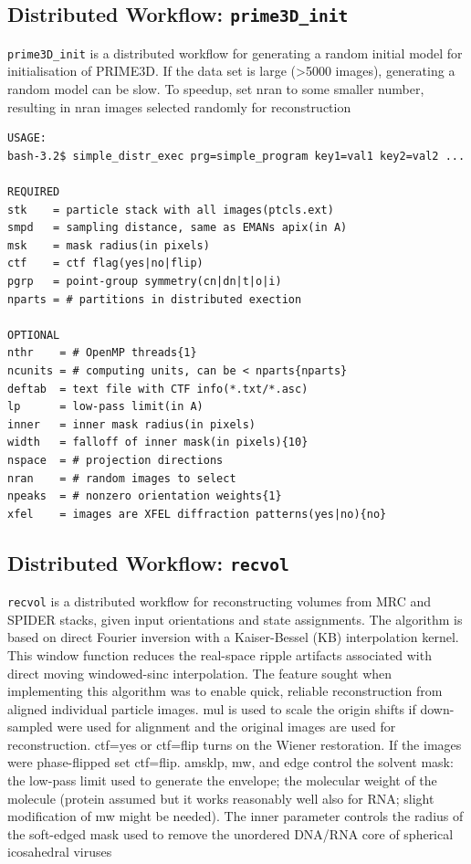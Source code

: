 \documentclass[a4paper,11pt]{article}
\newcommand{\prgname}[1]{\textcolor{NavyBlue}{\texttt{#1}}}
\begin{document}
\subsection{Distributed Workflow: \prgname{prime3D\_init}}
\label{prime3D_init}
\prgname{prime3D\_init} is a distributed workflow for generating a random initial model for initialisation of PRIME3D. If the data set is large (>5000 images), generating a random model can be slow. To speedup, set nran to some smaller number, resulting in nran images selected randomly for reconstruction

\begin{verbatim}
USAGE:
bash-3.2$ simple_distr_exec prg=simple_program key1=val1 key2=val2 ...

REQUIRED
stk    = particle stack with all images(ptcls.ext)
smpd   = sampling distance, same as EMANs apix(in A)
msk    = mask radius(in pixels)
ctf    = ctf flag(yes|no|flip)
pgrp   = point-group symmetry(cn|dn|t|o|i)
nparts = # partitions in distributed exection

OPTIONAL
nthr    = # OpenMP threads{1}
ncunits = # computing units, can be < nparts{nparts}
deftab  = text file with CTF info(*.txt/*.asc)
lp      = low-pass limit(in A)
inner   = inner mask radius(in pixels)
width   = falloff of inner mask(in pixels){10}
nspace  = # projection directions
nran    = # random images to select
npeaks  = # nonzero orientation weights{1}
xfel    = images are XFEL diffraction patterns(yes|no){no}
\end{verbatim}

\subsection{Distributed Workflow: \prgname{recvol}}
\label{recvol}
\prgname{recvol} is a distributed workflow for reconstructing volumes from MRC and SPIDER stacks, given input orientations and state assignments. The algorithm is based on direct Fourier inversion with a Kaiser-Bessel (KB) interpolation kernel. This window function reduces the real-space ripple artifacts associated with direct moving windowed-sinc interpolation. The feature sought when implementing this algorithm was to enable quick, reliable reconstruction from aligned individual particle images. mul is used to scale the origin shifts if down-sampled were used for alignment and the original images are used for reconstruction. ctf=yes or ctf=flip turns on the Wiener restoration. If the images were phase-flipped set ctf=flip. amsklp, mw, and edge control the solvent mask: the low-pass limit used to generate the envelope; the molecular weight of the molecule (protein assumed but it works reasonably well also for RNA; slight modification of mw might be needed). The inner parameter controls the radius of the soft-edged mask used to remove the unordered DNA/RNA core of spherical icosahedral viruses
\end{document}
